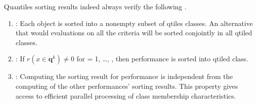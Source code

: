 \documentclass[a4paper,12pt,english]{sphinxhowto}
\begin{document}
Quantiles sorting results indeed always verify the following .
\begin{enumerate}
%
\item {} 
: Each object is sorted into a non\sphinxhyphen{}empty subset of  q\sphinxhyphen{}tiles classes. An alternative that would  evaluations on all the criteria will be sorted conjointly in all q\sphinxhyphen{}tiled classes.

\item {} 
: If \(r(x \in \mathbf{q}^k) \neq 0\)  for  = 1, …, , then performance  is sorted into  q\sphinxhyphen{}tiled class.

\item {} 
: Computing the sorting result for performance  is independent from the computing of the other performances’ sorting results. This property gives access to efficient parallel processing of class membership characteristics.

\end{enumerate}
\end{document}
